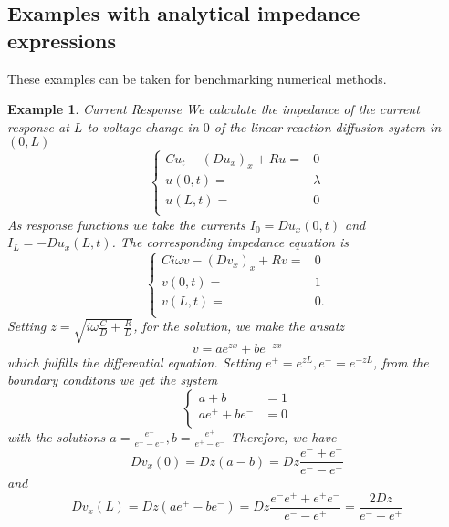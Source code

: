 \documentclass[12pt]{amsproc}
\newtheorem{example}{Example}
\begin{document}
\subsection{Examples with analytical impedance expressions}
These examples can be taken for benchmarking numerical methods.
\begin{example}{Current Response}
  We calculate the impedance of the current response at $L$ to voltage change in $0$ of the linear reaction  diffusion system in $(0,L)$  
  \begin{equation*}
    \begin{cases}
      Cu_t - (Du_x)_x + Ru=&0\\
      u(0,t)=&\lambda\\
      u(L,t)=&0\\
    \end{cases}
  \end{equation*}
    As response functions we take the currents  $I_0=Du_x(0,t)$ and $I_L=-Du_x(L,t)$.
    The corresponding impedance equation is
    \begin{equation*}
      \begin{cases}
        Ci\omega v - (Dv_x)_x +Rv =&0\\
        v(0,t)=&1\\
        v(L,t)=&0.\\
      \end{cases}
    \end{equation*}
Setting $z=\sqrt{i\omega\frac{C}{D}+\frac{R}{D}}$, for the solution, we make the ansatz
\begin{equation*}
  v=ae^{zx}+be^{-zx}
\end{equation*}
which fulfills the differential equation.
Setting $e^+=e^{zL},e^-=e^{-zL}$, from the boundary 
conditons we get the system
\begin{equation*}
  \begin{cases}
    a+b&=1\\
    ae^++be^-&=0\\
  \end{cases}
\end{equation*}
with the solutions $a=\frac{e^-}{e^--e^+},b=\frac{e^+}{e^+-e^-}$
Therefore, we have
\begin{equation*}
  Dv_x(0)=Dz(a-b)=Dz\frac{e^-+e^+}{e^--e^+}
\end{equation*}
and
\begin{equation*}
  Dv_x(L)=Dz(ae^+-be^-)=Dz\frac{e^-e^++e^+e^-}{e^--e^+}=\frac{2Dz}{e^--e^+}
\end{equation*}


\end{example}
\end{document}
